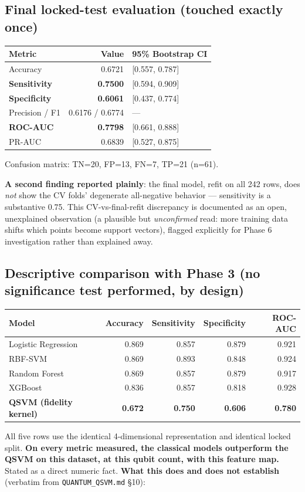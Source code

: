 \documentclass[11pt,a4paper]{article}
\newcommand{\code}[1]{\texttt{\small #1}}
\begin{document}
\subsection{Final locked-test evaluation (touched exactly once)}
\begin{center}
\begin{tabular}{lrl}
\toprule
\textbf{Metric} & \textbf{Value} & \textbf{95\% Bootstrap CI} \\
\midrule
Accuracy & 0.6721 & [0.557, 0.787] \\
\textbf{Sensitivity} & \textbf{0.7500} & [0.594, 0.909] \\
\textbf{Specificity} & \textbf{0.6061} & [0.437, 0.774] \\
Precision / F1 & 0.6176 / 0.6774 & --- \\
\textbf{ROC-AUC} & \textbf{0.7798} & [0.661, 0.888] \\
PR-AUC & 0.6839 & [0.527, 0.875] \\
\bottomrule
\end{tabular}
\end{center}
Confusion matrix: TN=20, FP=13, FN=7, TP=21 (n=61).

\textbf{A second finding reported plainly}: the final model, refit on all 242 rows, does \emph{not} show the CV folds' degenerate all-negative behavior --- sensitivity is a substantive 0.75. This CV-vs-final-refit discrepancy is documented as an open, unexplained observation (a plausible but \emph{unconfirmed} read: more training data shifts which points become support vectors), flagged explicitly for Phase 6 investigation rather than explained away.

\subsection{Descriptive comparison with Phase 3 (no significance test performed, by design)}
\begin{center}
\begin{tabular}{lrrrr}
\toprule
\textbf{Model} & \textbf{Accuracy} & \textbf{Sensitivity} & \textbf{Specificity} & \textbf{ROC-AUC} \\
\midrule
Logistic Regression & 0.869 & 0.857 & 0.879 & 0.921 \\
RBF-SVM & 0.869 & 0.893 & 0.848 & 0.924 \\
Random Forest & 0.869 & 0.857 & 0.879 & 0.917 \\
XGBoost & 0.836 & 0.857 & 0.818 & 0.928 \\
\textbf{QSVM (fidelity kernel)} & \textbf{0.672} & \textbf{0.750} & \textbf{0.606} & \textbf{0.780} \\
\bottomrule
\end{tabular}
\end{center}
All five rows use the identical 4-dimensional representation and identical locked split. \textbf{On every metric measured, the classical models outperform the QSVM on this dataset, at this qubit count, with this feature map.} Stated as a direct numeric fact. \textbf{What this does and does not establish} (verbatim from \code{QUANTUM\_QSVM.md} \S10):
\end{document}
